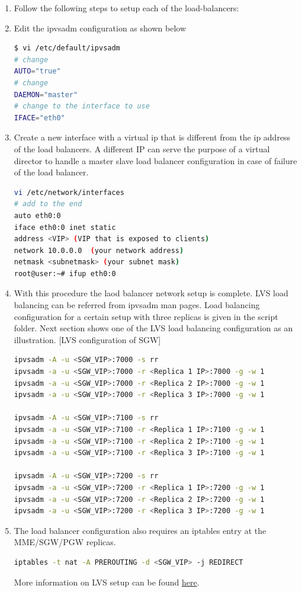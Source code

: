 \pdfminorversion=4\documentclass[hidelinks]{report}
\begin{document}
\begin{enumerate}
\item Follow the following steps to setup each of the load-balancers:

\item Edit the ipvsadm configuration as shown below
\begin{lstlisting}[language=bash]
$ vi /etc/default/ipvsadm
# change
AUTO="true"
# change
DAEMON="master"
# change to the interface to use
IFACE="eth0"
\end{lstlisting}
\item Create a new interface with a virtual ip that is different from the ip address of the load balancers. A different IP can serve the purpose of a virtual director to handle a master slave load balancer configuration in case of failure of the load balancer.
\begin{lstlisting}[language=bash]
vi /etc/network/interfaces
# add to the end
auto eth0:0
iface eth0:0 inet static
address <VIP> (VIP that is exposed to clients)
network 10.0.0.0  (your network address)
netmask <subnetmask> (your subnet mask)
root@user:~# ifup eth0:0 
\end{lstlisting}
\item With this procedure the laod balancer network setup is complete. LVS load balancing can be referred from ipvsadm man pages. Load balancing configuration for a certain setup with three replicas is given in the script folder. Next section shows one of the LVS load balancing configuration as an illustration.
[LVS configuration of SGW]
\begin{lstlisting}[language=bash]
ipvsadm -A -u <SGW_VIP>:7000 -s rr
ipvsadm -a -u <SGW_VIP>:7000 -r <Replica 1 IP>:7000 -g -w 1
ipvsadm -a -u <SGW_VIP>:7000 -r <Replica 2 IP>:7000 -g -w 1
ipvsadm -a -u <SGW_VIP>:7000 -r <Replica 3 IP>:7000 -g -w 1

ipvsadm -A -u <SGW_VIP>:7100 -s rr
ipvsadm -a -u <SGW_VIP>:7100 -r <Replica 1 IP>:7100 -g -w 1
ipvsadm -a -u <SGW_VIP>:7100 -r <Replica 2 IP>:7100 -g -w 1
ipvsadm -a -u <SGW_VIP>:7100 -r <Replica 3 IP>:7100 -g -w 1

ipvsadm -A -u <SGW_VIP>:7200 -s rr
ipvsadm -a -u <SGW_VIP>:7200 -r <Replica 1 IP>:7200 -g -w 1
ipvsadm -a -u <SGW_VIP>:7200 -r <Replica 2 IP>:7200 -g -w 1
ipvsadm -a -u <SGW_VIP>:7200 -r <Replica 3 IP>:7200 -g -w 1

\end{lstlisting}
\item The load balancer configuration also requires an iptables entry at the MME/SGW/PGW replicas.
\begin{lstlisting}[language=bash]
iptables -t nat -A PREROUTING -d <SGW_VIP> -j REDIRECT
\end{lstlisting}
More information on LVS setup can be found  \href{https://www.server-world.info/en/note?os=Ubuntu_14.04\&p=lvs}{\color{blue}here}.
\end{enumerate}
\end{document}

